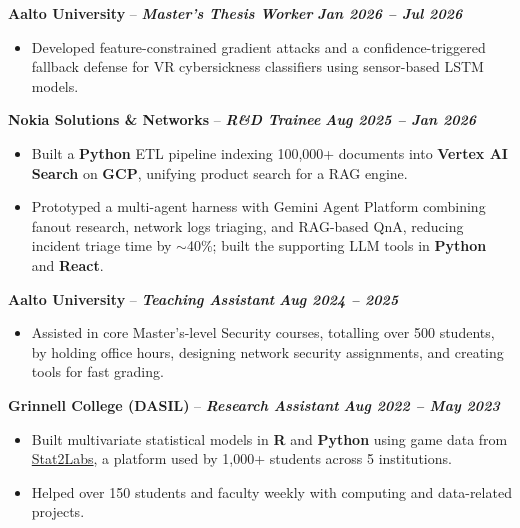 \documentclass[11pt,a4paper]{article}
\newcommand{\experienceheader}[3]{%
    \Needspace{7\baselineskip}%
    \noindent\textbf{#1} -- \textbf{\textit{#2}} \hfill \textbf{\textit{#3}}%
}
\begin{document}
\vspace{8pt}

\experienceheader{Aalto University}{Master's Thesis Worker}{Jan 2026 -- Jul 2026}
\begin{itemize}
    \item Developed feature-constrained gradient attacks and a confidence-triggered fallback defense for VR cybersickness classifiers using sensor-based LSTM models.
\end{itemize}

\vspace{8pt}

\experienceheader{Nokia Solutions \& Networks}{R\&D Trainee}{Aug 2025 -- Jan 2026}
\begin{itemize}
    \item Built a \textbf{Python} ETL pipeline indexing 100,000+ documents into \textbf{Vertex AI Search} on \textbf{GCP}, unifying product search for a RAG engine.
    \item Prototyped a multi-agent harness with Gemini Agent Platform combining fanout research, network logs triaging, and RAG-based QnA, reducing incident triage time by $\sim$40\%; built the supporting LLM tools in \textbf{Python} and \textbf{React}.
\end{itemize}

\vspace{8pt}

\experienceheader{Aalto University}{Teaching Assistant}{Aug 2024 -- 2025}
\begin{itemize}
    \item Assisted in core Master's-level Security courses, totalling over 500 students, by holding office hours, designing network security assignments, and creating tools for fast grading.
\end{itemize}

\vspace{8pt}

\experienceheader{Grinnell College (DASIL)}{Research Assistant}{Aug 2022 -- May 2023}
\begin{itemize}
    \item Built multivariate statistical models in \textbf{R} and \textbf{Python} using game data from \href{https://stat2labs.sites.grinnell.edu/}{Stat2Labs}, a platform used by 1,000+ students across 5 institutions.
    \item Helped over 150 students and faculty weekly with computing and data-related projects.
\end{itemize}
\end{document}
